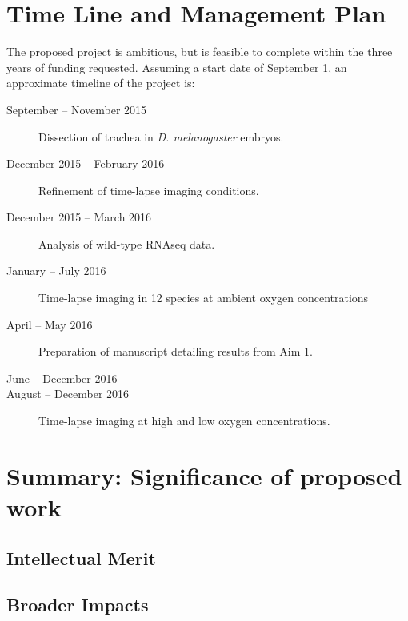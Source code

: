 \documentclass{proposal}
\begin{document}
\section{Time Line and Management Plan}

The proposed project is ambitious, but is feasible to complete within the three years of funding requested.  Assuming a start date of September 1, an approximate timeline of the project is: 

\begin{description}
\item[September -- November 2015] Dissection of trachea in {\em D. melanogaster} embryos.  

\item[December 2015 -- February 2016] Refinement of time-lapse imaging conditions. 

\item[December 2015 -- March 2016] Analysis of wild-type RNAseq data. 

\item[January -- July 2016] Time-lapse imaging in 12 species at ambient oxygen concentrations

\item[April -- May 2016] Preparation of manuscript detailing results from Aim 1.

\item[June -- December 2016] 

\item[August -- December 2016] Time-lapse imaging at high and low oxygen concentrations.


\item[]  

\end{description}



\section{Summary:  Significance of proposed work}

\subsection{Intellectual Merit}

\subsection{Broader Impacts}




\newpage
{}
\renewcommand{\thepage} {E--\arabic{page}}



\end{document}
